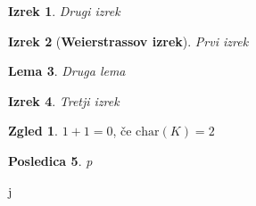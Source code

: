 \documentclass[a4paper]{amsart}
\theoremstyle{theorem}
\newtheorem{izrek}{Izrek}[section]
\newtheorem{lema}[izrek]{Lema}
\newtheorem{posledica}[izrek]{Posledica}
\theoremstyle{definition}
\newtheorem*{zgled*}{Zgled}
\begin{document}
\begin{izrek}
	Drugi izrek
\end{izrek}

\begin{izrek}[\textbf{Weierstrassov izrek}]
	Prvi izrek
\end{izrek}

\begin{lema}
	Druga lema
\end{lema}

\begin{izrek}
	Tretji izrek
\end{izrek}

\begin{zgled*}
	$1 + 1 = 0$, če $\text{char}(K) = 2$
\end{zgled*}

\begin{posledica}
	p
\end{posledica}

\newpage
j
\end{document}
